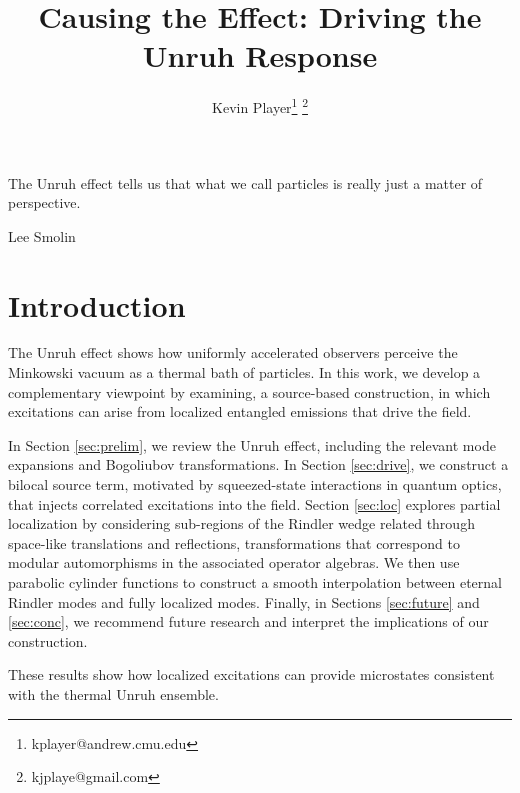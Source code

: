 \documentclass[12pt,a4paper]{article}
\begin{document}
\title{Causing the Effect: Driving the Unruh Response}
\author[1]{Kevin Player\footnote{kplayer@andrew.cmu.edu} \footnote{kjplaye@gmail.com}}

\maketitle

\epigraph{The Unruh effect tells us that what we call particles is really just a matter of perspective.}{Lee Smolin}



\section{Introduction}
The Unruh effect\cite{unruh1976notes} shows how uniformly accelerated observers perceive the Minkowski vacuum as a thermal bath of particles. In this work, we develop a complementary viewpoint by examining, a source-based construction, in which excitations can arise from localized entangled emissions that drive the field.


In Section \ref{sec:prelim}, we review the Unruh effect, including the relevant mode expansions and Bogoliubov transformations. In Section \ref{sec:drive}, we construct a bilocal source term, motivated by squeezed-state interactions in quantum optics, that injects correlated excitations into the field. Section \ref{sec:loc} explores partial localization by considering sub-regions of the Rindler wedge related through space-like translations and reflections, transformations that correspond to modular automorphisms in the associated operator algebras. We then use parabolic cylinder functions to construct a smooth interpolation between eternal Rindler modes and fully localized modes. Finally, in Sections \ref{sec:future} and \ref{sec:conc}, we recommend future research and interpret the implications of our construction.

These results show how localized excitations can provide microstates consistent with the thermal Unruh ensemble.
\end{document}
